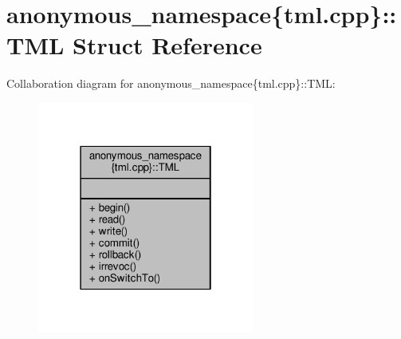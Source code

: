 \hypertarget{structanonymous__namespace_02tml_8cpp_03_1_1TML}{\section{anonymous\-\_\-namespace\{tml.\-cpp\}\-:\-:T\-M\-L Struct Reference}
\label{structanonymous__namespace_02tml_8cpp_03_1_1TML}
}


Collaboration diagram for anonymous\-\_\-namespace\{tml.\-cpp\}\-:\-:T\-M\-L\-:
\nopagebreak
\begin{figure}[H]
\begin{center}
\leavevmode
\includegraphics[width=202pt]{structanonymous__namespace_02tml_8cpp_03_1_1TML__coll__graph}
\end{center}
\end{figure}
